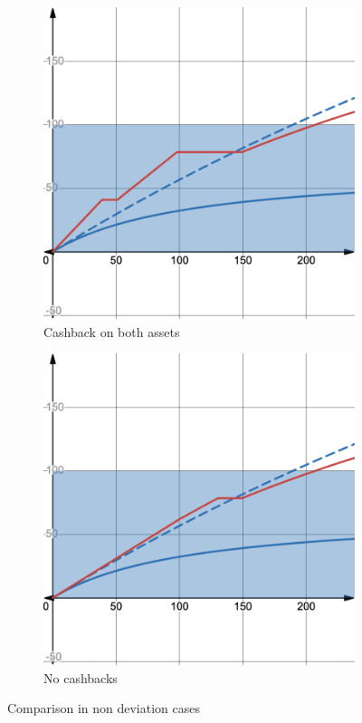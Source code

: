 \begin{figure}[h!]
	\centering
	\begin{subfigure}{0.4\textwidth} %
		\centering
		\includegraphics[width=\linewidth]{comparing_with_cfamm_no_deviation_big_cashback.png} %
		\caption{Cashback on both assets}
		\label{fig:img7}
	\end{subfigure}
	\hfill %
	\begin{subfigure}{0.4\textwidth}
		\centering
		\includegraphics[width=\linewidth]{comparing_with_cfamm_no_deviation_no_cashback.png} %
		\caption{No cashbacks}
		\label{fig:img8}
	\end{subfigure}
	\caption{Comparison in non deviation cases}
	\label{fig:img9}
\end{figure}
\FloatBarrier

